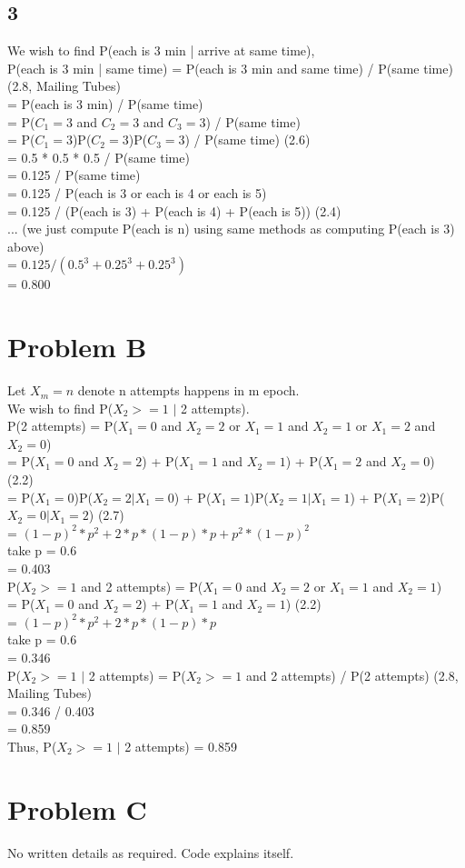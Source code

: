 \documentclass{article}
\begin{document}
\subsection{3}
We wish to find P(each is 3 min | arrive at same time),\\
P(each is 3 min | same time) = P(each is 3 min and same time) / P(same time) (2.8, Mailing Tubes)\\
= P(each is 3 min) / P(same time)\\
= P($C_{1}=3$ and $C_{2}=3$ and $C_{3}=3$) / P(same time)\\
= P($C_{1}=3$)P($C_{2}=3$)P($C_{3}=3$) / P(same time) (2.6)\\
= 0.5 * 0.5 * 0.5 / P(same time)\\
= 0.125 / P(same time)\\
= 0.125 / P(each is 3 or each is 4 or each is 5)\\
= 0.125 / (P(each is 3) + P(each is 4) + P(each is 5)) (2.4)\\
... (we just compute P(each is n) using same methods as computing P(each is 3) above)\\
= $0.125 / (0.5 ^ 3 + 0.25 ^ 3 + 0.25 ^ 3)$\\
= 0.800\\

\section{Problem B}
Let $X_{m}=n$ denote n attempts happens in m epoch.\\
We wish to find P($X_{2}>=1$ $|$ 2 attempts).\\

P(2 attempts) = P($X_{1}=0$ and $X_{2}=2$ or $X_{1}=1$ and $X_{2}=1$ or $X_{1}=2$ and $X_{2}=0$)\\
= P($X_{1}=0$ and $X_{2}=2$) + P($X_{1}=1$ and $X_{2}=1$) + P($X_{1}=2$ and $X_{2}=0$) (2.2)\\
= P($X_{1}=0$)P($X_{2}=2|X_{1}=0$) + P($X_{1}=1$)P($X_{2}=1|X_{1}=1$) + P($X_{1}=2$)P($X_{2}=0|X_{1}=2$) (2.7)\\
= $(1-p)^2*p^2 + 2*p*(1-p)*p + p^2*(1-p)^2$\\
take p = 0.6\\
= 0.403\\

P($X_{2}>=1$ and 2 attempts) = P($X_{1}=0$ and $X_{2}=2$ or $X_{1}=1$ and $X_{2}=1$)\\
= P($X_{1}=0$ and $X_{2}=2$) + P($X_{1}=1$ and $X_{2}=1$) (2.2)\\
= $(1-p)^2*p^2+2*p*(1-p)*p$\\
take p = 0.6\\
= 0.346\\

P($X_{2}>=1$ $|$ 2 attempts) = P($X_{2}>=1$ and 2 attempts) / P(2 attempts) (2.8, Mailing Tubes)\\
= 0.346 / 0.403\\
= 0.859\\

Thus, P($X_{2}>=1$ $|$ 2 attempts) = 0.859\\

\section{Problem C}
No written details as required. Code explains itself.
\end{document}
